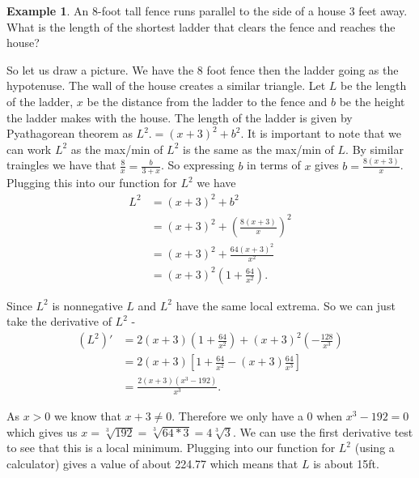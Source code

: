 \documentclass[12pt,reqno]{article}
\theoremstyle{definition}
\newtheorem*{Example}{Example}
\begin{document}
	\begin{Example}
		An 8-foot tall fence runs parallel to the side of a house 3 feet away. What is the length of the shortest ladder that clears the fence and reaches the house? 
		
		So let us draw a picture. We have the 8 foot fence then the ladder going as the hypotenuse. The wall of the house creates a similar triangle. Let $L$ be the length of the ladder, $x$ be the distance from the ladder to the fence and $b$ be the height the ladder makes with the house.  The length of the ladder is given by Pyathagorean theorem as $L^2. = (x + 3)^2 + b^2$. It is important to note that we can work $L^2$ as the max/min of $L^2$ is the same as the max/min of $L$. By similar traingles we have that $\frac{8}{x} = \frac{b}{3 + x}$. So expressing $b$ in terms of $x$ gives $b = \frac{8 (x + 3)}{x}$. Plugging this into our function for $L^2$ we have 
		\begin{align*}
			L^2 &= (x + 3)^2 + b^2 \\
				&= (x + 3)^2 + \left(\frac{8 (x + 3)}{x}\right)^2 \\
				&= (x + 3)^2 + \frac{64 (x + 3)^2}{x^2} \\
				&= (x + 3)^2 \left(1 + \frac{64}{x^2}\right).
		\end{align*}
		
		Since $L^2$ is nonnegative $L$ and $L^2$ have the same local extrema. So we can just take the derivative of $L^2$ - 
		\begin{align*}
			(L^2)' &= 2(x + 3)\left(1 + \frac{64}{x^2}\right) + (x + 3)^2 \left(-\frac{128}{x^3}\right) \\
				   &=2(x + 3) \left[ 1 + \frac{64}{x^2} - (x + 3)\frac{64}{x^3}\right] \\
				   &= \frac{2(x + 3)(x^3 - 192)}{x^3}.
		\end{align*}
		
		As $x > 0$ we know that $x+ 3 \neq 0$. Therefore we only have a 0 when $x^3 - 192 = 0$ which gives us $x = \sqrt[3]{192} = \sqrt[3]{64*3} = 4 \sqrt[3]{3}$. We can use the first derivative test to see that this is a local minimum. Plugging into our function for $L^2$ (using a calculator) gives a value of about 224.77 which means that $L$ is about 15ft. 
	\end{Example}	
	
\end{document}
